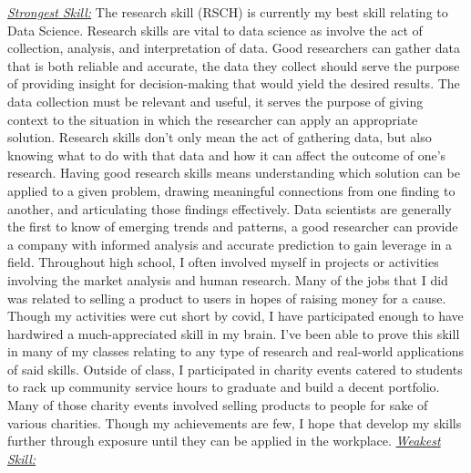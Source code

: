 \documentclass[a4paper, 11pt]{report}
\begin{document}
\underline{\emph{Strongest Skill:}}\newline
The research skill (RSCH) \cite{SFIA} is currently my best skill relating to Data Science. Research skills are vital to data science as involve the act of collection, analysis, and interpretation of data. Good researchers can gather data that is both reliable and accurate, the data they collect should serve the purpose of providing insight for decision-making that would yield the desired results. The data collection must be relevant and useful, it serves the purpose of giving context to the situation in which the researcher can apply an appropriate solution. Research skills don’t only mean the act of gathering data, but also knowing what to do with that data and how it can affect the outcome of one’s research. Having good research skills means understanding which solution can be applied to a given problem, drawing meaningful connections from one finding to another, and articulating those findings effectively. Data scientists are generally the first to know of emerging trends and patterns, a good researcher can provide a company with informed analysis and accurate prediction to gain leverage in a field. Throughout high school, I often involved myself in projects or activities involving the market analysis and human research. Many of the jobs that I did was related to selling a product to users in hopes of raising money for a cause. Though my activities were cut short by covid, I have participated enough to have hardwired a much-appreciated skill in my brain. I’ve been able to prove this skill in many of my classes relating to any type of research and real-world applications of said skills. Outside of class, I participated in charity events catered to students to rack up community service hours to graduate and build a decent portfolio. Many of those charity events involved selling products to people for sake of various charities. Though my achievements are few, I hope that develop my skills further through exposure until they can be applied in the workplace.\newline\newline
\underline{\emph{Weakest Skill:}}\newline
\end{document}
